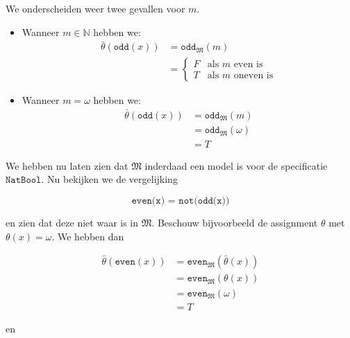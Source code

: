 \documentclass[a4paper,11pt]{article}
\begin{document}
\begin{itemize}
We onderscheiden weer twee gevallen voor $m$.

\begin{itemize}

\item
Wanneer $m \in \mathbb{N}$ hebben we:
\begin{align*}
\bar \theta(\texttt{odd}(x)) &= \texttt{odd}_{\mathfrak{M}}(m) \\
                             &= \begin{cases}
  F & \text{als $m$ even is} \\
  T & \text{als $m$ oneven is}
\end{cases}
\end{align*}

\item
Wanneer $m = \omega$ hebben we:
\begin{align*}
\bar \theta(\texttt{odd}(x)) &= \texttt{odd}_{\mathfrak{M}}(m) \\
                             &= \texttt{odd}_{\mathfrak{M}}(\omega) \\
                             &= T
\end{align*}

\end{itemize}

\end{itemize}

We hebben nu laten zien dat $\mathfrak{M}$ inderdaad een model is voor de
specificatie $\texttt{NatBool}$. Nu bekijken we de vergelijking

\begin{displaymath}
\texttt{even(x) = not(odd(x))}
\end{displaymath}

en zien dat deze niet waar is in $\mathfrak{M}$. Beschouw bijvoorbeeld de
assignment $\theta$ met $\theta(x) = \omega$. We hebben dan

\begin{align*}
\bar \theta(\texttt{even}(x)) &= \texttt{even}_{\mathfrak{M}}(\bar \theta(x)) \\
                              &= \texttt{even}_{\mathfrak{M}}(\theta(x)) \\
                              &= \texttt{even}_{\mathfrak{M}}(\omega) \\
                              &= T
\end{align*}

en
\end{document}
